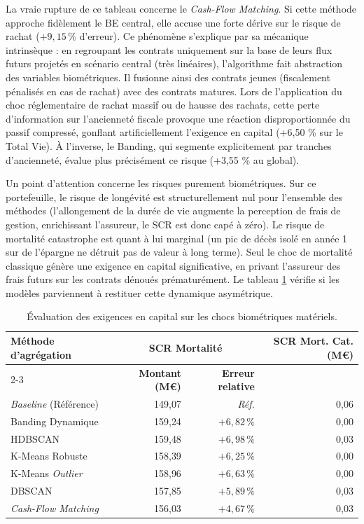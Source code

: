 La vraie rupture de ce tableau concerne le \textit{Cash-Flow Matching}. Si cette méthode approche fidèlement le BE central, elle accuse une forte dérive sur le risque de rachat ($+9{,}15\,\%$ d'erreur). Ce phénomène s'explique par sa mécanique intrinsèque : en regroupant les contrats uniquement sur la base de leurs flux futurs projetés en scénario central (très linéaires), l'algorithme fait abstraction des variables biométriques. Il fusionne ainsi des contrats jeunes (fiscalement pénalisés en cas de rachat) avec des contrats matures. Lors de l'application du choc réglementaire de rachat massif ou de hausse des rachats, cette perte d'information sur l'ancienneté fiscale provoque une réaction disproportionnée du passif compressé, gonflant artificiellement l'exigence en capital (+6{,}50 \% sur le Total Vie). À l'inverse, le Banding, qui segmente explicitement par tranches d'ancienneté, évalue plus précisément ce risque (+3{,}55 \% au global).

Un point d'attention concerne les risques purement biométriques. Sur ce portefeuille, le risque de longévité est structurellement nul pour l'ensemble des méthodes (l'allongement de la durée de vie augmente la perception de frais de gestion, enrichissant l'assureur, le SCR est donc capé à zéro). Le risque de mortalité catastrophe est quant à lui marginal (un pic de décès isolé en année 1 sur de l'épargne ne détruit pas de valeur à long terme). Seul le choc de mortalité classique génère une exigence en capital significative, en privant l'assureur des frais futurs sur les contrats dénoués prématurément. Le tableau \ref{tab:comparaison_scr_mortalite} vérifie si les modèles parviennent à restituer cette dynamique asymétrique.

\begin{table}[H]
    \centering
    \renewcommand{\arraystretch}{1.4}
    \begin{tabular}{|l|r|r|r|}
        \hline
        \multirow{2}{*}{\textbf{Méthode d'agrégation}} & \multicolumn{2}{c|}{\textbf{SCR Mortalité}} & \multirow{2}{*}{\textbf{SCR Mort. Cat. (M\euro{})}} \\
        \cline{2-3}
        & \textbf{Montant (M\euro{})} & \textbf{Erreur relative} & \\
        \hline
        \textit{Baseline} (Référence) & 149{,}07 & \textit{Réf.} & 0{,}06 \\
        \hline
        Banding Dynamique & 159{,}24 & $+6{,}82\,\%$ & 0{,}00 \\
        HDBSCAN & 159{,}48 & $+6{,}98\,\%$ & 0{,}03 \\
        K-Means Robuste & 158{,}39 & $+6{,}25\,\%$ & 0{,}00 \\
        K-Means \textit{Outlier} & 158{,}96 & $+6{,}63\,\%$ & 0{,}00 \\
        DBSCAN & 157{,}85 & $+5{,}89\,\%$ & 0{,}03 \\
        \textit{Cash-Flow Matching} & 156{,}03 & $+4{,}67\,\%$ & 0{,}03 \\
        \hline
    \end{tabular}
    \caption{Évaluation des exigences en capital sur les chocs biométriques matériels.}
    \label{tab:comparaison_scr_mortalite}
\end{table}


